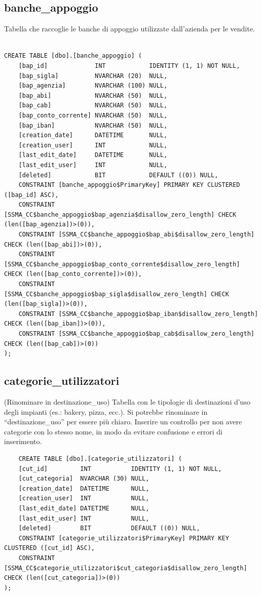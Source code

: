 \documentclass[12pt]{article}
\begin{document}
\subsection{banche\_appoggio}
Tabella che raccoglie le banche di appoggio utilizzate dall'azienda per le vendite.
\begin{lstlisting}

CREATE TABLE [dbo].[banche_appoggio] (
    [bap_id]             INT            IDENTITY (1, 1) NOT NULL,
    [bap_sigla]          NVARCHAR (20)  NULL,
    [bap_agenzia]        NVARCHAR (100) NULL,
    [bap_abi]            NVARCHAR (50)  NULL,
    [bap_cab]            NVARCHAR (50)  NULL,
    [bap_conto_corrente] NVARCHAR (50)  NULL,
    [bap_iban]           NVARCHAR (50)  NULL,
    [creation_date]      DATETIME       NULL,
    [creation_user]      INT            NULL,
    [last_edit_date]     DATETIME       NULL,
    [last_edit_user]     INT            NULL,
    [deleted]            BIT            DEFAULT ((0)) NULL,
    CONSTRAINT [banche_appoggio$PrimaryKey] PRIMARY KEY CLUSTERED ([bap_id] ASC),
    CONSTRAINT [SSMA_CC$banche_appoggio$bap_agenzia$disallow_zero_length] CHECK (len([bap_agenzia])>(0)),
    CONSTRAINT [SSMA_CC$banche_appoggio$bap_abi$disallow_zero_length] CHECK (len([bap_abi])>(0)),
    CONSTRAINT [SSMA_CC$banche_appoggio$bap_conto_corrente$disallow_zero_length] CHECK (len([bap_conto_corrente])>(0)),
    CONSTRAINT [SSMA_CC$banche_appoggio$bap_sigla$disallow_zero_length] CHECK (len([bap_sigla])>(0)),
    CONSTRAINT [SSMA_CC$banche_appoggio$bap_iban$disallow_zero_length] CHECK (len([bap_iban])>(0)),
    CONSTRAINT [SSMA_CC$banche_appoggio$bap_cab$disallow_zero_length] CHECK (len([bap_cab])>(0))
);
\end{lstlisting}

\subsection{categorie\_utilizzatori}(Rinominare in destinazione\_uso)
Tabella con le tipologie di destinazioni d'uso degli impianti (es.: bakery, pizza, ecc.).
Si potrebbe rinominare in ``destinazione\_uso'' per essere più chiaro.
Inserire un controllo per non avere categorie con lo stesso nome, in modo da evitare confusione e errori di inserimento.
\begin{lstlisting}
    CREATE TABLE [dbo].[categorie_utilizzatori] (
    [cut_id]         INT           IDENTITY (1, 1) NOT NULL,
    [cut_categoria]  NVARCHAR (30) NULL,
    [creation_date]  DATETIME      NULL,
    [creation_user]  INT           NULL,
    [last_edit_date] DATETIME      NULL,
    [last_edit_user] INT           NULL,
    [deleted]        BIT           DEFAULT ((0)) NULL,
    CONSTRAINT [categorie_utilizzatori$PrimaryKey] PRIMARY KEY CLUSTERED ([cut_id] ASC),
    CONSTRAINT [SSMA_CC$categorie_utilizzatori$cut_categoria$disallow_zero_length] CHECK (len([cut_categoria])>(0))
);

\end{lstlisting}
\end{document}
